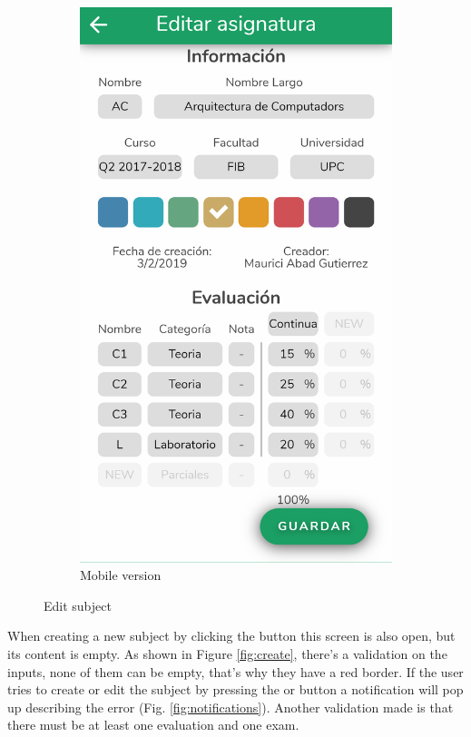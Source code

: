 \begin{figure}[ht!]
\begin{subfigure}[b]{0.243\textwidth-0.1cm}
        \includegraphics[frame,width=\textwidth]{media/screenshots/screenshot-edit.png}
        \caption{Mobile version}
    \end{subfigure}
    \caption{Edit subject}
    \label{fig:edit}
\end{figure}
\vfill

\clearpage\newpage

When creating a new subject by clicking the  button this screen is also open, but its content is empty. As shown in Figure \ref{fig:create}, there's a validation on the inputs, none of them can be empty, that's why they have a red border. If the user tries to create or edit the subject by pressing the  or  button a notification will pop up describing the error (Fig. \ref{fig:notifications}). Another validation made is that there must be at least one evaluation and one exam.

